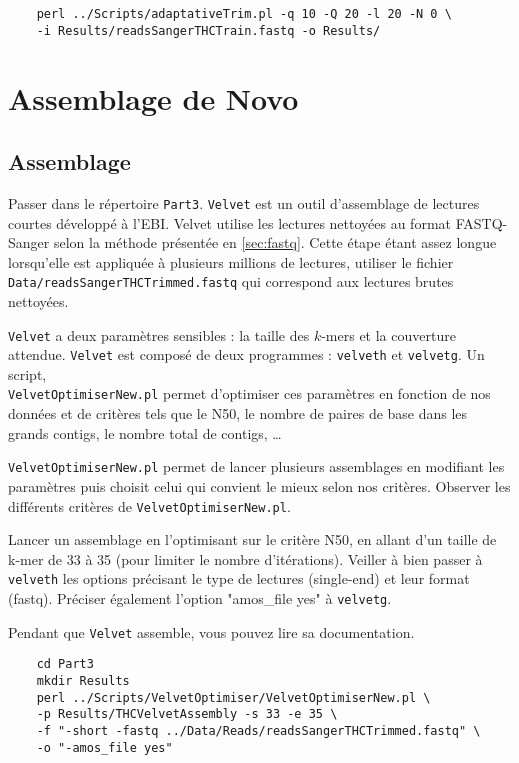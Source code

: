 \documentclass[a4paper,12pt]{article}
\begin{document}
\begin{lstlisting}	
	perl ../Scripts/adaptativeTrim.pl -q 10 -Q 20 -l 20 -N 0 \
	-i Results/readsSangerTHCTrain.fastq -o Results/
\end{lstlisting}


\section{Assemblage de Novo}
\label{sec:assd}
\subsection{Assemblage}
Passer dans le répertoire \verb=Part3=. \verb=Velvet= est un outil d'assemblage de lectures courtes développé à l'EBI. Velvet utilise les lectures nettoyées au format FASTQ-Sanger selon la méthode présentée en \ref{sec:fastq}. Cette étape étant assez longue lorsqu'elle est appliquée à plusieurs millions de lectures, utiliser le fichier \verb=Data/readsSangerTHCTrimmed.fastq= qui correspond aux lectures brutes nettoyées.

\verb=Velvet= a deux paramètres sensibles : la taille des $k$-mers et la couverture attendue. \verb=Velvet= est composé de deux programmes : \verb=velveth= et \verb=velvetg=.
Un script,\\
\verb=VelvetOptimiserNew.pl= permet d'optimiser ces paramètres en fonction de nos données et de critères tels que le N50, le nombre de paires de base dans les grands contigs, le nombre total de contigs, \ldots

\verb=VelvetOptimiserNew.pl= permet de lancer plusieurs assemblages en modifiant les paramètres puis choisit celui qui convient le mieux selon nos critères.
Observer les différents critères de \verb=VelvetOptimiserNew.pl=.

Lancer un assemblage en l'optimisant sur le critère N50, en allant d'un taille de k-mer de 33 à 35 (pour limiter le nombre d'itérations). Veiller à bien passer à \verb=velveth= les options précisant le type de lectures (single-end) et leur format (fastq). Préciser également l'option "amos\_file yes" à \verb=velvetg=.

Pendant que \verb=Velvet= assemble, vous pouvez lire sa documentation.


\begin{lstlisting}	
	cd Part3
	mkdir Results
	perl ../Scripts/VelvetOptimiser/VelvetOptimiserNew.pl \
	-p Results/THCVelvetAssembly -s 33 -e 35 \
	-f "-short -fastq ../Data/Reads/readsSangerTHCTrimmed.fastq" \
	-o "-amos_file yes"
\end{lstlisting}	
\end{document}
